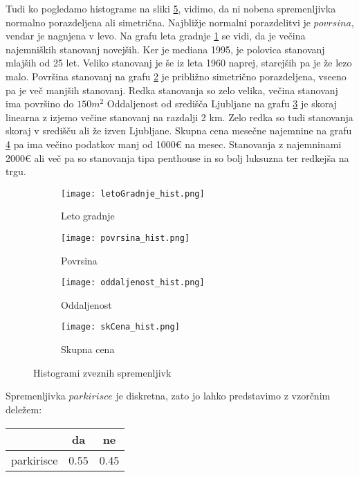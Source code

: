 \documentclass[a4paper, 12pt]{article}
\begin{document}
Tudi ko pogledamo histograme na sliki \ref{figure:1}, vidimo, da ni nobena
spremenljivka normalno porazdeljena ali simetrična. Najbližje normalni
porazdelitvi je $ povrsina $, vendar je nagnjena v levo. Na grafu leta
gradnje \ref{figure:1a} se vidi, da je večina najemniških stanovanj novejših.
Ker je mediana 1995, je polovica stanovanj mlajših od 25 let. Veliko stanovanj
je še iz leta 1960 naprej, starejših pa je že lezo malo. Površina stanovanj na
grafu \ref{figure:1b} je približno simetrično porazdeljena, vseeno pa je več
manjših stanovanj. Redka stanovanja so zelo velika, večina stanovanj ima
površino do $150 m^{2}$ Oddaljenost od središča Ljubljane na grafu
\ref{figure:1c} je skoraj linearna z izjemo večine stanovanj na razdalji 2 km.
Zelo redka so tudi stanovanja skoraj v središču ali že izven Ljubljane.
Skupna cena mesečne najemnine na grafu \ref{figure:1d} pa ima večino podatkov
manj od 1000€ na mesec. Stanovanja z najemninami 2000€ ali več pa so stanovanja
tipa penthouse in so bolj luksuzna ter redkejša na trgu.

\begin{figure}[H]
\begin{subfigure}{0.5\textwidth}
	\texttt{[image: letoGradnje\_hist.png]}
	\caption{Leto gradnje}
	\label{figure:1a}
\end{subfigure}
\begin{subfigure}{0.5\textwidth}
	\texttt{[image: povrsina\_hist.png]}
	\caption{Povrsina}
	\label{figure:1b}
\end{subfigure}

\begin{subfigure}{0.5\textwidth}
	\texttt{[image: oddaljenost\_hist.png]}
	\caption{Oddaljenost}
	\label{figure:1c}
\end{subfigure}
\begin{subfigure}{0.5\textwidth}
	\texttt{[image: skCena\_hist.png]}
	\caption{Skupna cena}
	\label{figure:1d}
\end{subfigure}
\caption{Histogrami zveznih spremenljivk}
\label{figure:1}
\end{figure}

Spremenljivka $ parkirisce $ je diskretna, zato jo lahko predstavimo z
vzorčnim deležem:

\begin{center}
\begin{tabular}{ c|cc }
	& da & ne \\
	\hline
	parkirisce & 0.55 & 0.45 \\
\end{tabular}
\end{center}
\end{document}
